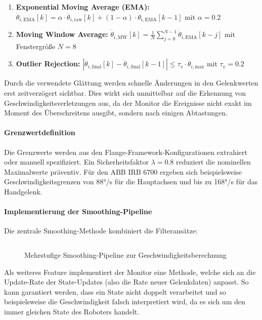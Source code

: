 \begin{enumerate}
	\item \textbf{Exponential Moving Average (EMA):}
	      $\dot{\theta}_{i,\text{EMA}}[k] = \alpha \cdot \dot{\theta}_{i,\text{raw}}[k] + (1-\alpha) \cdot \dot{\theta}_{i,\text{EMA}}[k-1]$ mit $\alpha = 0.2$

	\item \textbf{Moving Window Average:}
	      $\dot{\theta}_{i,\text{MW}}[k] = \frac{1}{N} \sum_{j=0}^{N-1} \dot{\theta}_{i,\text{EMA}}[k-j]$ mit Fenstergröße $N = 8$

	\item \textbf{Outlier Rejection:}
	      $|\dot{\theta}_{i,\text{final}}[k] - \dot{\theta}_{i,\text{final}}[k-1]| \leq \tau_v \cdot \dot{\theta}_{i,\text{max}}$ mit $\tau_v = 0.2$
\end{enumerate}
\noindent
Durch die verwendete Glättung werden schnelle Änderungen in den Gelenkwerten
erst zeitverzögert sichtbar. Dies wirkt sich unmittelbar auf die Erkennung von
Geschwindigkeitsverletzungen aus, da der Monitor die Ereignisse nicht exakt im
Moment des Überschreitens ausgibt, sondern nach einigen Abtastungen.

\paragraph{Grenzwertdefinition} Die Grenzwerte werden aus den
Flange-Framework-Konfigurationen extrahiert oder manuell spezifiziert. Ein
Sicherheitsfaktor $\lambda = 0.8$ reduziert die nominellen Maximalwerte
präventiv. Für den ABB IRB 6700 ergeben sich beispielsweise
Geschwindigkeitsgrenzen von 88°/s für die Hauptachsen und bis zu 168°/s für das
Handgelenk.

\paragraph{Implementierung der Smoothing-Pipeline}
Die zentrale Smoothing-Methode kombiniert die Filteransätze:

\begin{figure}[H]
	\inputminted[fontsize=\footnotesize]{csharp}{code-snippets/SmoothVelocities.cs}
	\caption{Mehrstufige Smoothing-Pipeline zur Geschwindigkeitsberechnung}
	\label{listing:smoothing_pipeline}
\end{figure}

\noindent
Als weiteres Feature implementiert der Monitor eine Methode, welche sich an die
Update-Rate der State-Updates (also die Rate neuer Gelenkdaten) anpasst. So kann
garantiert werden, dass ein State nicht doppelt verarbeitet und so
beispielsweise die Geschwindigkeit falsch interpretiert wird, da es sich um den
immer gleichen State des Roboters handelt.\\

